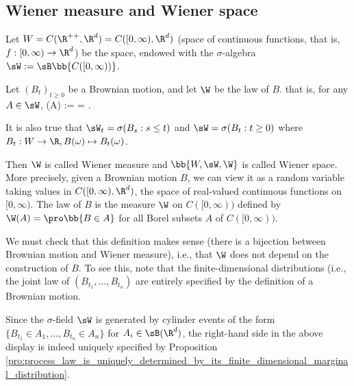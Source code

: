 \subsection{Wiener measure and Wiener space}


\begin{definition}\label{def:wiener_measure}
Let $W = C(\R^{++},\R^d) = C([0,\infty),\R^d)$ (space of continuous functions, that is, $f:[0,\infty) \to \R^d$) be the space, endowed with the $\sigma$-algebra $\sW :=\sB\bb{C([0,\infty))}$. %

Let $(B_t)_{t \geq 0}$ be a Brownian motion, and let $\W$ be the law of $B$. that is, for any $A \in \sW$,
\be
\W(A) := \pro{} = \pro{}.
\ee

It is also true that $\sW_t = \sigma(B_s: s \leq t)$ and $\sW = \sigma(B_t: t\geq 0)$ where $B_t: W\to\R, B(\omega) \mapsto B_t(\omega)$.

Then $\W$ is called Wiener measure and $\bb{W,\sW,\W}$ is called Wiener space.
More precisely, given a Brownian motion $B$, we can view it as a random variable taking values in $C([0,\infty),\R^d)$, the space of real-valued continuous functions on $[0,\infty)$. The law of $B$ is the measure $\W$ on $C([0,\infty))$ defined by $\W(A) = \pro\bb{B \in A}$ for all Borel subsets $A$ of $C([0,\infty))$.
\end{definition}

\begin{remark}
We must check that this definition makes sense (there is a bijection between Brownian motion and Wiener measure), i.e., that $\W$ does not depend on the construction of $B$. To see this, note that the finite-dimensional distributions (i.e., the joint law of $(B_{t_1} ,\dots,B_{t_n})$ are entirely specified by the definition of a Brownian motion.

Since the $\sigma$-field $\sW$ is generated by cylinder events of the form $\{B_{t_1} \in A_1,\dots,B_{t_n} \in A_n\}$ for $A_i \in \sB(\R^d)$, the right-hand side in the above display is indeed uniquely specified by Proposition \ref{pro:process_law_is_uniquely_determined_by_its_finite_dimensional_marginal_distribution}.
\end{remark}



